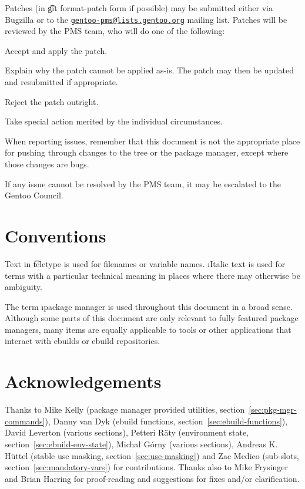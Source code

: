 Patches (in \t{git format-patch} form if possible) may be submitted either via Bugzilla or to the
\href{mailto:gentoo-pms@lists.gentoo.org}{\nolinkurl{gentoo-pms@lists.gentoo.org}} mailing list.
Patches will be reviewed by the PMS team, who will do one of the following:

\begin{compactitem}
\item Accept and apply the patch.
\item Explain why the patch cannot be applied as-is. The patch may then be updated and resubmitted
if appropriate.
\item Reject the patch outright.
\item Take special action merited by the individual circumstances.
\end{compactitem}

When reporting issues, remember that this document is not the appropriate place for pushing through
changes to the tree or the package manager, except where those changes are bugs.

If any issue cannot be resolved by the PMS team, it may be escalated to the Gentoo Council.

\section{Conventions}

Text in \t{teletype} is used for filenames or variable names. \i{Italic} text is used for terms
with a particular technical meaning in places where there may otherwise be ambiguity.

The term \i{package manager} is used throughout this document in a broad sense. Although some parts
of this document are only relevant to fully featured package managers, many items are equally
applicable to tools or other applications that interact with ebuilds or ebuild repositories.

\section{Acknowledgements}

Thanks to Mike Kelly (package manager provided utilities, section~\ref{sec:pkg-mgr-commands}),
Danny van Dyk (ebuild functions, section~\ref{sec:ebuild-functions}), David Leverton (various
sections), Petteri Räty (environment state, section~\ref{sec:ebuild-env-state}), Michał Górny
(various sections), Andreas K. Hüttel (stable use masking, section~\ref{sec:use-masking}) and
Zac Medico (sub-slots, section~\ref{sec:mandatory-vars}) for contributions. Thanks also to
Mike Frysinger and Brian Harring for proof-reading and suggestions for fixes and/or clarification.


